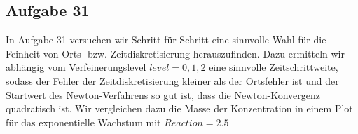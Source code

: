 
\subsection{Aufgabe 31}

In Aufgabe 31 versuchen wir Schritt für Schritt eine sinnvolle Wahl für die Feinheit von Orts- bzw. Zeitdiskretisierung herauszufinden. Dazu ermitteln wir abhängig vom Verfeinerungslevel $level = 0,1,2$ eine sinnvolle Zeitschrittweite, sodass der Fehler der Zeitdiskretisierung kleiner als der Ortsfehler ist und der Startwert des Newton-Verfahrens so gut ist, dass die Newton-Konvergenz quadratisch ist. 
Wir vergleichen dazu die Masse der Konzentration in einem Plot für das exponentielle Wachstum mit $ Reaction = 2.5 $

\begin{figure}[H]
	\centering
\end{figure}
\begin{figure}[H]
	\centering
\end{figure}
